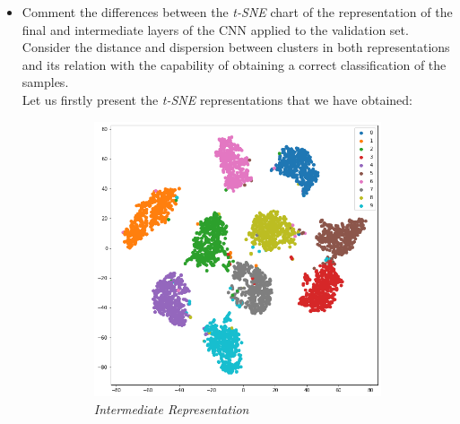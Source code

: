 \documentclass[a4paper]{article}
\begin{document}
\begin{itemize}
  \item Comment the differences between the \emph{t-SNE} chart of the representation of the final and intermediate layers of the CNN applied to the validation set. Consider the distance and dispersion between clusters in both representations and its relation with the capability of obtaining a correct classification of the samples.\\

        Let us  firstly present the \emph{t-SNE} representations that we have obtained:

        \begin{figure}[H]
          \centering
          \begin{subfigure}{.5\textwidth}
            \centering
            \includegraphics[width=\linewidth]{Figures/SimpleCNN-representation-intermediate.png}
            \caption{\emph{Intermediate Representation}}
            \label{fig:tsne:1}
          \end{subfigure}%
          \begin{subfigure}{.5\textwidth}
            \centering

\end{subfigure}
\end{figure}
\end{itemize}
\end{document}

